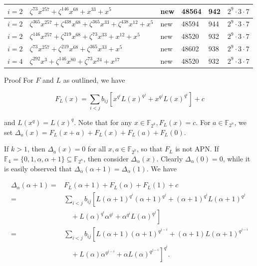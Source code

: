 \documentclass[10pt]{article}
\begin{document}
\begin{table}[h]
\begin{center}
\begin{tabular}{|l|l|l|l|l|l|}
\hline
$i=2$ & $\zeta^{73} x^{257}+\zeta^{146} x^{68}+x^{33}+x^{5}$ & new & 48564 & 942 & $2^{9} \cdot 3 \cdot 7$ \\
\hline
$i=2$ & $\zeta^{365} x^{257}+\zeta^{438} x^{68}+\zeta^{365} x^{33}+\zeta^{438} x^{12}+x^{5}$ & new & 48594 & 944 & $2^{9} \cdot 3 \cdot 7$ \\
\hline
$i=2$ & $\zeta^{146} x^{257}+\zeta^{219} x^{68}+\zeta^{73} x^{33}+x^{12}+x^{5}$ & new & 48520 & 932 & $2^{9} \cdot 3 \cdot 7$ \\
\hline
$i=2$ & $\zeta^{73} x^{257}+\zeta^{219} x^{68}+\zeta^{365} x^{33}+x^{5}$ & new & 48602 & 938 & $2^{9} \cdot 3 \cdot 7$ \\
\hline
$i=4$ & $\zeta^{292} x^{3}+\zeta^{146} x^{80}+\zeta^{73} x^{24}+x^{17}$ & new & 48520 & 932 & $2^{9} \cdot 3 \cdot 7$ \\
\hline
\end{tabular}
\end{center}
\end{table}

Proof For $F$ and $L$ as outlined, we have

$$
F_{L}(x)=\sum_{i<j} b_{i j}\left[x^{q^{i}} L(x)^{q^{j}}+x^{q^{j}} L(x)^{q^{i}}\right]+c
$$

and $L\left(x^{q}\right)=L(x)^{q}$. Note that for any $x \in \mathbb{F}_{2^{k}}, F_{L}(x)=c$. For $a \in \mathbb{F}_{2^{n}}$, we set $\Delta_{a}(x)= F_{L}(x+a)+F_{L}(x)+F_{L}(a)+F_{L}(0)$.

If $k>1$, then $\Delta_{a}(x)=0$ for all $x, a \in \mathbb{F}_{2^{k}}$, so that $F_{L}$ is not APN. If $\mathbb{F}_{4}=\{0,1, \alpha, \alpha+ 1\} \subseteq \mathbb{F}_{2^{n}}$, then consider $\Delta_{\alpha}(x)$. Clearly $\Delta_{\alpha}(0)=0$, while it is easily observed that $\Delta_{\alpha}(\alpha+1)=\Delta_{\alpha}(1)$. We have

$$
\begin{aligned}
\Delta_{\alpha}(\alpha+1)= & F_{L}(\alpha+1)+F_{L}(\alpha)+F_{L}(1)+c \\
= & \sum_{i<j} b_{i j}\left[L(\alpha+1)^{q^{i}}(\alpha+1)^{q^{j}}+(\alpha+1)^{q^{i}} L(\alpha+1)^{q^{j}}\right. \\
& \left.\quad+L(\alpha)^{q^{i}} \alpha^{q^{j}}+\alpha^{q^{i}} L(\alpha)^{q^{j}}\right] \\
= & \sum_{i<j} b_{i j}\left[L(\alpha+1)(\alpha+1)^{q^{j-i}}+(\alpha+1) L(\alpha+1)^{q^{j-i}}\right. \\
& \left.\quad+L(\alpha) \alpha^{q^{j-i}}+\alpha L(\alpha)^{q^{j-i}}\right]^{q^{i}} .
\end{aligned}
$$
\end{document}
